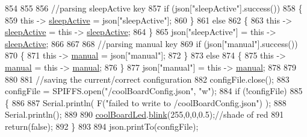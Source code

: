 \begin{DoxyCode}
854 
855             
856             \textcolor{comment}{//parsing sleepActive key}
857             \textcolor{keywordflow}{if} (json[\textcolor{stringliteral}{"sleepActive"}].success())
858             \{
859                 \textcolor{keyword}{this} -> \hyperlink{class_cool_board_a0a51b2287139f66c738101fb53139230}{sleepActive} = json[\textcolor{stringliteral}{"sleepActive"}];
860             \}
861             \textcolor{keywordflow}{else}
862             \{
863                 \textcolor{keyword}{this} -> \hyperlink{class_cool_board_a0a51b2287139f66c738101fb53139230}{sleepActive} = \textcolor{keyword}{this} -> \hyperlink{class_cool_board_a0a51b2287139f66c738101fb53139230}{sleepActive};
864             \}
865             json[\textcolor{stringliteral}{"sleepActive"}] = \textcolor{keyword}{this} -> \hyperlink{class_cool_board_a0a51b2287139f66c738101fb53139230}{sleepActive};
866 
867 
868             \textcolor{comment}{//parsing manual key}
869             \textcolor{keywordflow}{if} (json[\textcolor{stringliteral}{"manual"}].success())
870             \{
871                 \textcolor{keyword}{this} -> \hyperlink{class_cool_board_a7c8e505a5804b109e112d5a03df6ea2b}{manual} = json[\textcolor{stringliteral}{"manual"}];
872             \}
873             \textcolor{keywordflow}{else}
874             \{
875                 \textcolor{keyword}{this} -> \hyperlink{class_cool_board_a7c8e505a5804b109e112d5a03df6ea2b}{manual} = \textcolor{keyword}{this} -> \hyperlink{class_cool_board_a7c8e505a5804b109e112d5a03df6ea2b}{manual};
876             \}
877             json[\textcolor{stringliteral}{"manual"}] = \textcolor{keyword}{this} -> \hyperlink{class_cool_board_a7c8e505a5804b109e112d5a03df6ea2b}{manual};
878 
879 
880 
881             \textcolor{comment}{//saving the current/correct configuration}
882             configFile.close();
883             configFile = SPIFFS.open(\textcolor{stringliteral}{"/coolBoardConfig.json"}, \textcolor{stringliteral}{"w"});
884             \textcolor{keywordflow}{if} (!configFile)
885             \{
886             
887                 Serial.println( F(\textcolor{stringliteral}{"failed to write to /coolBoardConfig.json"}) );
888                 Serial.println();
889 
890                 \hyperlink{class_cool_board_a1b1d3c684a5baa56b08486e192fd8e97}{coolBoardLed}.\hyperlink{class_cool_board_led_a96e1ea13003eee34c9dbcef340404426}{blink}(255,0,0,0.5);\textcolor{comment}{//shade of red     }
891                 \textcolor{keywordflow}{return}(\textcolor{keyword}{false});
892             \}
893 
894             json.printTo(configFile);

\end{DoxyCode}
